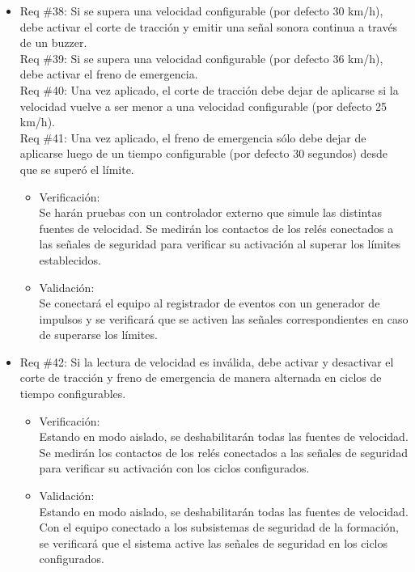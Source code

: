 \documentclass[11pt]{charter}
\begin{document}
\begin{itemize}
\newpage

\item Req \#38: Si se supera una velocidad configurable (por defecto 30 km/h), debe activar el corte de tracción y emitir una señal sonora continua a través de un buzzer. \\
Req \#39: Si se supera una velocidad configurable (por defecto 36 km/h), debe activar el freno de emergencia. \\
Req \#40: Una vez aplicado, el corte de tracción debe dejar de aplicarse si la velocidad vuelve a ser menor a una velocidad configurable (por defecto 25 km/h). \\
Req \#41: Una vez aplicado, el freno de emergencia sólo debe dejar de aplicarse luego de un tiempo configurable (por defecto 30 segundos) desde que se superó el límite.
\begin{itemize}
  \item Verificación:\\
  Se harán pruebas con un controlador externo que simule las distintas fuentes de velocidad.
  Se medirán los contactos de los relés conectados a las señales de seguridad para verificar su activación al superar los límites establecidos.
  \item Validación:\\
  Se conectará el equipo al registrador de eventos con un generador de impulsos y se verificará que se activen las señales correspondientes en caso de superarse los límites.
\end{itemize}

\item Req \#42: Si la lectura de velocidad es inválida, debe activar y desactivar el corte de tracción y freno de emergencia de manera alternada en ciclos de tiempo configurables.
\begin{itemize}
  \item Verificación:\\
  Estando en modo aislado, se deshabilitarán todas las fuentes de velocidad.
  Se medirán los contactos de los relés conectados a las señales de seguridad para verificar su activación con los ciclos configurados.
  \item Validación:\\
  Estando en modo aislado, se deshabilitarán todas las fuentes de velocidad.
  Con el equipo conectado a los subsistemas de seguridad de la formación, se verificará que el sistema active las señales de seguridad en los ciclos configurados.
\end{itemize}


\end{itemize}
\end{document}
